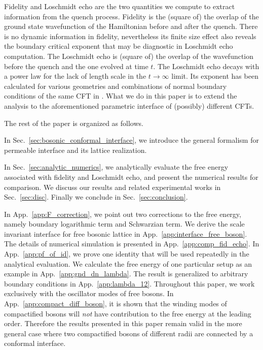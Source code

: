 Fidelity and Loschmidt echo are the two quantities we compute to extract information from the quench process. Fidelity is the (square of) the overlap of the ground state wavefunction of the Hamiltonian before and after the quench. There is no dynamic information in fidelity, nevertheless its finite size effect also reveals the boundary critical exponent that may be diagnostic in Loschmidt echo computation. The Loschmidt echo is (square of) the overlap of the wavefunction before the quench and the one evolved at time $t$. The Loschmidt echo decays with a power law for the lack of length scale in the $t \rightarrow \infty$ limit. Its exponent has been calculated for various geometries and combinations of normal boundary conditions of the same CFT in . What we do in this paper is to extend the analysis to the aforementioned parametric interface of (possibly) different CFTs. 

The rest of the paper is organized as follows. 

In Sec.~\ref{sec:bosonic_conformal_interface}, we introduce the general formalism for permeable interface and its lattice realization. 

In Sec.~\ref{sec:analytic_numerics}, we analytically evaluate the free energy associated with fidelity and Loschmidt echo, and present the numerical results for comparison. We discuss our results and related experimental works in Sec.~\ref{sec:disc}. Finally we conclude in Sec.~\ref{sec:conclusion}. 

In App.~\ref{app:F_correction}, we point out two corrections to the free energy, namely boundary logarithmic term and Schwarzian term. We derive the scale invariant interface for free bosonic lattice in App.~\ref{app:interface_free_boson}. The details of numerical simulation is presented in App.~\ref{app:comp_fid_echo}. In App.~\ref{app:pf_of_id}, we prove one identity that will be used repeatedly in the analytical evaluation. We calculate the free energy of one particular setup as an example in App.~\ref{app:gnd_dn_lambda}. The result is generalized to arbitrary boundary conditions in App.~\ref{app:lambda_12}. Throughout this paper, we work exclusively with the oscillator modes of free bosons. In App.~\ref{app:compact_diff_boson}, it is shown that the winding modes of compactified bosons will \emph{not} have contribution to the free energy at the leading order. Therefore the results presented in this paper remain valid in the more general case where two compactified bosons of different radii are connected by a conformal interface.

